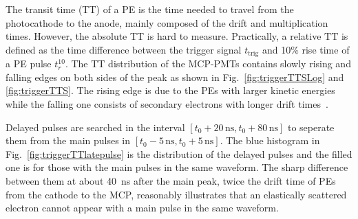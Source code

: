 The transit time (TT) of a PE is the time needed to travel from the photocathode to the anode, mainly composed of the drift and multiplication times. However, the absolute TT is hard to measure. Practically, a relative $\mathrm{TT}$ is defined as the time difference between the trigger signal $t_{\mathrm{trig}}$ and 10\% rise time of a PE pulse $t_r^{10}$. The $\mathrm{TT}$ distribution of the MCP-PMTs contains slowly rising and falling edges on both sides of the peak as shown in Fig.~\ref{fig:triggerTTSLog} and \ref{fig:triggerTTS}. The rising edge is due to the PEs with larger kinetic energies while the falling one consists of secondary electrons with longer drift times~\cite{longtail}.

Delayed pulses are searched in the interval $[t_0+20\,\mathrm{ns},t_0+80\,\mathrm{ns}]$ to seperate them from the main pulses in $[t_0-5\,\mathrm{ns},t_0+5\,\mathrm{ns}]$. The blue histogram in Fig.~\ref{fig:triggerTTlatepulse} is the distribution of the delayed pulses and the filled one is for those with the main pulses in the same waveform. The sharp difference between them at about \SI{40}{ns} after the main peak, twice the drift time of PEs from the cathode to the MCP, reasonably illustrates that an elastically scattered electron cannot appear with a main pulse in the same waveform.


